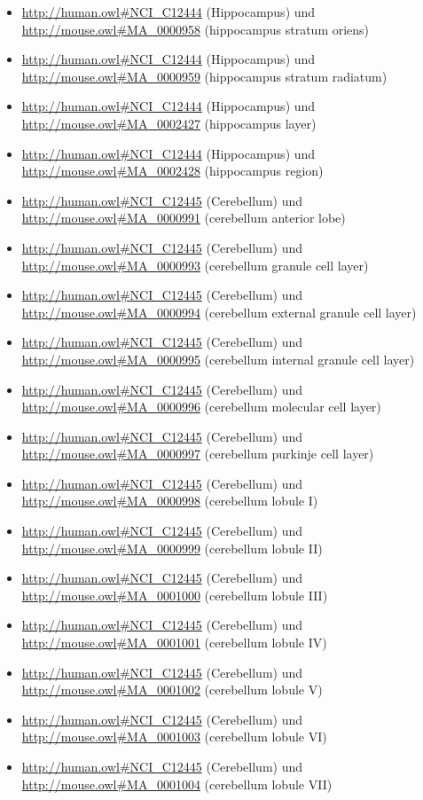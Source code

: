 \begin{itemize}
	\item \url{http://human.owl#NCI_C12444} (Hippocampus) und \url{http://mouse.owl#MA_0000958} (hippocampus stratum oriens)
	\item \url{http://human.owl#NCI_C12444} (Hippocampus) und \url{http://mouse.owl#MA_0000959} (hippocampus stratum radiatum)
	\item \url{http://human.owl#NCI_C12444} (Hippocampus) und \url{http://mouse.owl#MA_0002427} (hippocampus layer)
	\item \url{http://human.owl#NCI_C12444} (Hippocampus) und \url{http://mouse.owl#MA_0002428} (hippocampus region)
	\item \url{http://human.owl#NCI_C12445} (Cerebellum) und \url{http://mouse.owl#MA_0000991} (cerebellum anterior lobe)
	\item \url{http://human.owl#NCI_C12445} (Cerebellum) und \url{http://mouse.owl#MA_0000993} (cerebellum granule cell layer)
	\item \url{http://human.owl#NCI_C12445} (Cerebellum) und \url{http://mouse.owl#MA_0000994} (cerebellum external granule cell layer)
	\item \url{http://human.owl#NCI_C12445} (Cerebellum) und \url{http://mouse.owl#MA_0000995} (cerebellum internal granule cell layer)
	\item \url{http://human.owl#NCI_C12445} (Cerebellum) und \url{http://mouse.owl#MA_0000996} (cerebellum molecular cell layer)
	\item \url{http://human.owl#NCI_C12445} (Cerebellum) und \url{http://mouse.owl#MA_0000997} (cerebellum purkinje cell layer)
	\item \url{http://human.owl#NCI_C12445} (Cerebellum) und \url{http://mouse.owl#MA_0000998} (cerebellum lobule I)
	\item \url{http://human.owl#NCI_C12445} (Cerebellum) und \url{http://mouse.owl#MA_0000999} (cerebellum lobule II)
	\item \url{http://human.owl#NCI_C12445} (Cerebellum) und \url{http://mouse.owl#MA_0001000} (cerebellum lobule III)
	\item \url{http://human.owl#NCI_C12445} (Cerebellum) und \url{http://mouse.owl#MA_0001001} (cerebellum lobule IV)
	\item \url{http://human.owl#NCI_C12445} (Cerebellum) und \url{http://mouse.owl#MA_0001002} (cerebellum lobule V)
	\item \url{http://human.owl#NCI_C12445} (Cerebellum) und \url{http://mouse.owl#MA_0001003} (cerebellum lobule VI)
	\item \url{http://human.owl#NCI_C12445} (Cerebellum) und \url{http://mouse.owl#MA_0001004} (cerebellum lobule VII)

\end{itemize}
